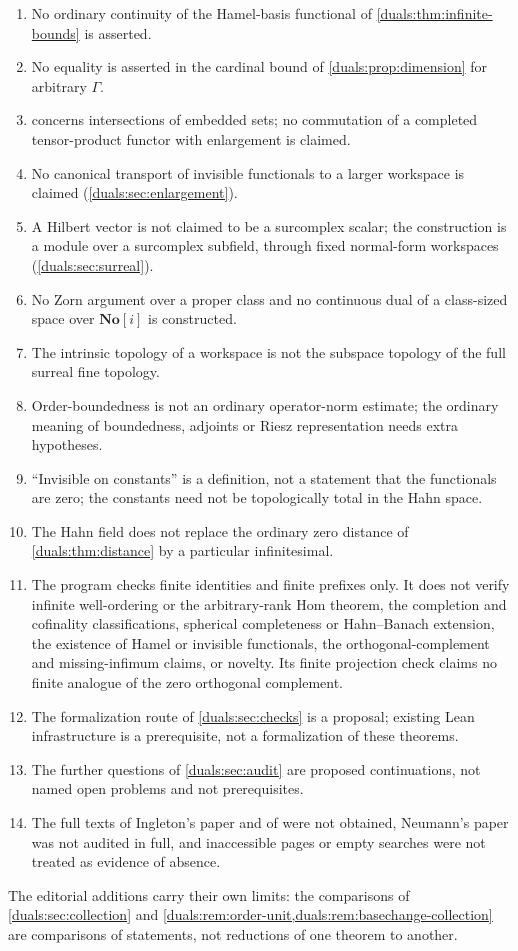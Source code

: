 \documentclass[11pt,letterpaper]{article}
\numberwithin{equation}{section}
\theoremstyle{definition}
\theoremstyle{remark}
\newcommand{\No}{\mathbf{No}}
\begin{document}
\begin{enumerate}
 bounds need not have a least element (\cref{duals:prop:order-bound}).
\item No ordinary continuity of the Hamel-basis functional of
 \cref{duals:thm:infinite-bounds} is asserted.
\item No equality is asserted in the cardinal bound of
 \cref{duals:prop:dimension} for arbitrary $\Gamma$.
\item {} concerns intersections of embedded sets;
 no commutation of a completed tensor-product functor with enlargement is
 claimed.
\item No canonical transport of invisible functionals to a larger
 workspace is claimed (\cref{duals:sec:enlargement}).
\item A Hilbert vector is not claimed to be a surcomplex scalar; the
 construction is a module over a surcomplex subfield, through fixed
 normal-form workspaces (\cref{duals:sec:surreal}).
\item No Zorn argument over a proper class and no continuous dual of a
 class-sized space over $\No[i]$ is constructed.
\item The intrinsic topology of a workspace is not the subspace topology
 of the full surreal fine topology.
\item Order-boundedness is not an ordinary operator-norm estimate; the
 ordinary meaning of boundedness, adjoints or Riesz representation needs
 extra hypotheses.
\item ``Invisible on constants'' is a definition, not a statement that the
 functionals are zero; the constants need not be topologically total in
 the Hahn space.
\item The Hahn field does not replace the ordinary zero distance of
 \cref{duals:thm:distance} by a particular infinitesimal.
\item The program checks finite identities and finite prefixes only. It
 does not verify infinite well-ordering or the arbitrary-rank Hom theorem,
 the completion and cofinality classifications, spherical completeness or
 Hahn--Banach extension, the existence of Hamel or invisible functionals,
 the orthogonal-complement and missing-infimum claims, or novelty. Its
 finite projection check claims no finite analogue of the zero orthogonal
 complement.
\item The formalization route of \cref{duals:sec:checks} is a proposal;
 existing Lean infrastructure is a prerequisite, not a formalization of
 these theorems.
\item The further questions of \cref{duals:sec:audit} are proposed
 continuations, not named open problems and not prerequisites.
\item The full texts of Ingleton's paper and of \cite{AN} were not
 obtained, Neumann's paper was not audited in full, and inaccessible
 pages or empty searches were not treated as evidence of absence.
\end{enumerate}
The editorial additions carry their own limits: the comparisons of
\cref{duals:sec:collection} and
\cref{duals:rem:order-unit,duals:rem:basechange-collection} are
comparisons of statements, not reductions of one theorem to another.
\end{document}
